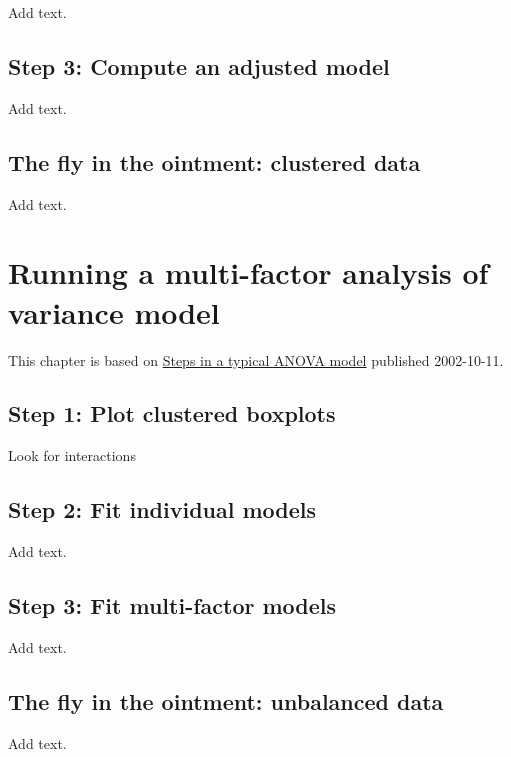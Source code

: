 \documentclass[
  letterpaper,
  DIV=11,
  numbers=noendperiod]{scrreprt}
\begin{document}
Add text.

\section{Step 3: Compute an adjusted
model}\label{step-3-compute-an-adjusted-model-1}

Add text.

\section{The fly in the ointment: clustered
data}\label{the-fly-in-the-ointment-clustered-data-1}

Add text.


\chapter{Running a multi-factor analysis of variance
model}\label{running-a-multi-factor-analysis-of-variance-model}

This chapter is based on \href{http://www.pmean.com/posts/anova/}{Steps
in a typical ANOVA model} published 2002-10-11.

\section{Step 1: Plot clustered
boxplots}\label{step-1-plot-clustered-boxplots}

Look for interactions

\section{Step 2: Fit individual
models}\label{step-2-fit-individual-models}

Add text.

\section{Step 3: Fit multi-factor
models}\label{step-3-fit-multi-factor-models}

Add text.

\section{The fly in the ointment: unbalanced
data}\label{the-fly-in-the-ointment-unbalanced-data}

Add text.
\end{document}
